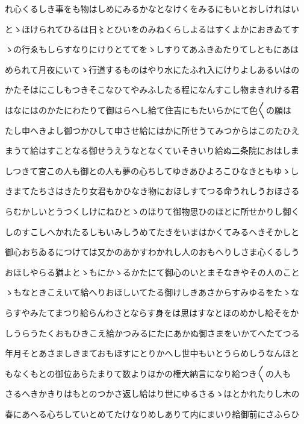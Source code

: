 \documentclass[a4paper,11pt,landscape]{ltjtarticle}
\begin{document}
れ心くるしき事をも物はしめにみるかなとなけくをみるにもいとおしけれはい
\par\medskip
とゝほけられてひるは日〻とひいをのみねくらしよるはすくよかにおきゐてす
\par\medskip
ゝの行ゑもしらすなりにけりとててをゝしすりてあふきゐたりてしともにあは
\par\medskip
められて月夜にいてゝ行道するものはやり水にたふれ入にけりよしあるいはの
\par\medskip
かたそはにこしもつきそこなひてやみふしたる程になんすこし物まきれける君
\par\medskip
はなにはのかたにわたりて御はらへし給て住吉にもたいらかにて色〱の願は
\par\medskip
たし申へきよし御つかひして申させ給にはかに所せうてみつからはこのたひえ
\par\medskip
まうて給はすことなる御せうえうなとなくていそきいり給ぬ二条院におはしま
\par\medskip
しつきて宮この人も御との人も夢の心ちしてゆきあひよろこひなきともゆゝし
\par\medskip
きまてたちさはきたり女君もかひなき物におほしすてつる命うれしうおほさる
\par\medskip
らむかしいとうつくしけにねひとゝのほりて御物思ひのほとに所せかりし御く
\par\medskip
しのすこしへかれたるしもいみしうめてたきをいまはかくてみるへきそかしと
\par\medskip
御心おちゐるにつけては又かのあかすわかれし人のおもへりしさま心くるしう
\par\medskip
おほしやらる猶よとゝもにかゝるかたにて御心のいとまそなきやその人のこと
\par\medskip
ゝもなときこえいて給へりおほしいてたる御けしきあさからすみゆるをたゝな
\par\medskip
らすやみたてまつり給らんわさとならす身をは思はすなとほのめかし給そをか
\par\medskip
しうらうたくおもひきこえ給かつみるにたにあかぬ御さまをいかてへたてつる
\par\medskip
年月そとあさましきまておもほすにとりかへし世中もいとうらめしうなんほと
\par\medskip
もなくもとの御位あらたまりて数よりほかの権大納言になり給つき〱の人も
\par\medskip
さるへきかきりはもとのつかさ返し給はり世にゆるさるゝほとかれたりし木の
\par\medskip
春にあへる心ちしていとめてたけなりめしありて内にまいり給御前にさふらひ
\par\medskip
\end{document}
